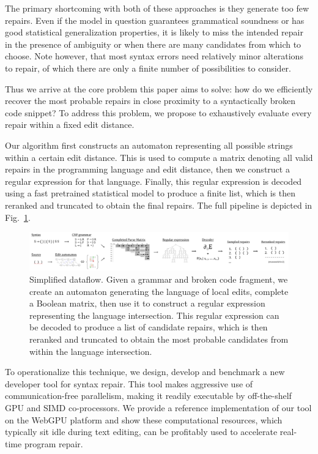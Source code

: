\documentclass[sigplan,review,acmsmall,nonacm,screen,anonymous]{acmart}\settopmatter{printfolios=false,printccs=false,printacmref=false}
\begin{document}
The primary shortcoming with both of these approaches is they generate too few repairs. Even if the model in question guarantees grammatical soundness or has good statistical generalization properties, it is likely to miss the intended repair in the presence of ambiguity or when there are many candidates from which to choose. Note however, that most syntax errors need relatively minor alterations to repair, of which there are only a finite number of possibilities to consider.

Thus we arrive at the core problem this paper aims to solve: how do we efficiently recover the most probable repairs in close proximity to a syntactically broken code snippet? To address this problem, we propose to exhaustively evaluate every repair within a fixed edit distance.

Our algorithm first constructs an automaton representing all possible strings within a certain edit distance. This is used to compute a matrix denoting all valid repairs in the programming language and edit distance, then we construct a regular expression for that language. Finally, this regular expression is decoded using a fast pretrained statistical model to produce a finite list, which is then reranked and truncated to obtain the final repairs. The full pipeline is depicted in Fig.~\ref{fig:arch_simp}.

\begin{figure}[h!]
  \includegraphics[width=\textwidth]{flow}\vspace{-1pt}
  \caption{Simplified dataflow. Given a grammar and broken code fragment, we create an automaton generating the language of local edits, complete a Boolean matrix, then use it to construct a regular expression representing the language intersection. This regular expression can be decoded to produce a list of candidate repairs, which is then reranked and truncated to obtain the most probable candidates from within the language intersection.}\label{fig:arch_simp}
\end{figure}

To operationalize this technique, we design, develop and benchmark a new developer tool for syntax repair. This tool makes aggressive use of communication-free parallelism, making it readily executable by off-the-shelf GPU and SIMD co-processors. We provide a reference implementation of our tool on the WebGPU platform and show these computational resources, which typically sit idle during text editing, can be profitably used to accelerate real-time program repair.
\end{document}
